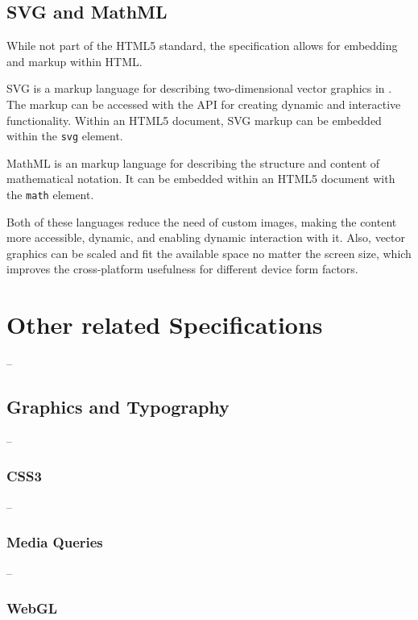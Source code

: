 \subsection{SVG and MathML}

While not part of the HTML5 standard, the specification allows for
embedding  \cite{SVGTiny12} and  \cite{MathML}
markup within HTML.

SVG is a markup language for describing two-dimensional vector
graphics in . The markup can be accessed with the 
API for creating dynamic and interactive functionality. Within an
HTML5 document, SVG markup can be embedded within the \texttt{svg}
element.

MathML is an  markup language for describing the structure
and content of mathematical notation. It can be embedded within an
HTML5 document with the \texttt{math} element.

Both of these languages reduce the need of custom images, making the
content more accessible, dynamic, and enabling dynamic interaction
with it. Also, vector graphics can be scaled and fit the available
space no matter the screen size, which improves the cross-platform
usefulness for different device form factors.

\section{Other related Specifications}

--

\subsection{Graphics and Typography}

--

\subsubsection{CSS3}

--

\subsubsection{Media Queries}

--

\subsubsection{WebGL}

